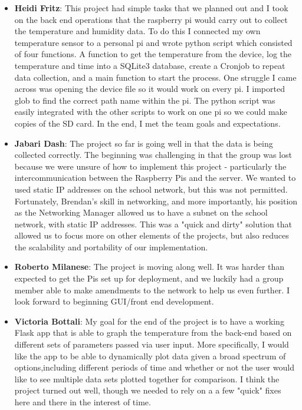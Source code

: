 \documentclass{article}
\begin{document}
\begin{itemize}
				
				\item {\bfseries Heidi Fritz}: This project had simple tasks that we planned out and I took on the back end operations that the raspberry pi would 
				carry out to collect the temperature and humidity data.  To do this I connected my own temperature sensor to a personal pi and wrote 
				python script which consisted of four functions.  A function to get the temperature from the device, log the temperature and time into a 
				SQLite3 database, create a Cronjob to repeat data collection, and a main function to start the process.  One struggle I came across was 
				opening the device file so it would work on every pi.  I imported glob to find the correct path name within the pi.  The python script 
				was easily integrated with the other scripts to work on one pi so we could make copies of the SD card.  In the end, I met the team goals 
				and expectations.
				\item {\bfseries Jabari Dash}: The project so far is going well in that the data is being collected correctly.
									The beginning was challenging in that the group was lost because we were unsure of how to 
									implement this project - particularly the intercommunication between the 
									Raspberry Pis and the server. We wanted to used static IP addresses on the 
									school network, but this was not permitted. Fortunately, Brendan's skill in networking,
									and more importantly, his position as the Networking Manager allowed us to have a subnet
									on the school network, with static IP addresses. This was a "quick and dirty" solution that 
									allowed us to focus more on other elements of the projects, but also reduces the scalability
									and portability of our implementation.
				\item {\bfseries Roberto Milanese}: The project is moving along well. It was harder than expected to get the Pis set up for deployment, and we 													luckily had a group member able to make amendments to the network to help us even further. I look forward 														to beginning GUI/front end development.
				
				\item {\bfseries Victoria Bottali}:	My goal for the end of the project is to have a working Flask app that is able to graph 
										the temperature from the back-end based on different sets of parameters passed via user input. More 				
										specifically, I would like the app to be able to dynamically plot data given a broad spectrum of 
										options,including different periods of time and whether or not the user would like to see multiple data sets 
										plotted together for comparison. I think the project turned out well, though we needed 
										to rely on a a few "quick" fixes here and there in the interest of time.   	
			\end{itemize}
			
\end{document}
